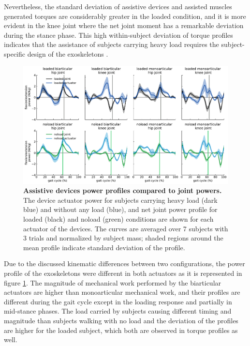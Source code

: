 \documentclass[10pt,letterpaper]{article}
\begin{document}
Nevertheless, the standard deviation of assistive devices and assisted muscles generated torques are considerably greater in the loaded condition, and it is more evident in the knee joint where the net joint moment has a remarkable deviation during the stance phase. This high within-subject deviation of torque profiles indicates that the assistance of subjects carrying heavy load requires the subject-specific design of the exoskeletons \cite{2}.\\
\begin{figure}[ht]   
	\centering
	\includegraphics[width=\linewidth]{Ideal_Exo_MonovsBi_Figures/PaperFigure_Exoskeletons_Power.pdf}
	\vspace{1mm}
	\caption{{\small\textbf{Assistive devices power profiles compared to joint powers.} The device actuator power for subjects carrying heavy load (dark blue) and without any load (blue), and net joint power profile for loaded (black) and noload (green) conditions are shown for each actuator of the devices. The curves are averaged over 7 subjects with 3 trials and normalized by subject mass; shaded regions around the mean profile indicate standard deviation of the profile.}}
	\label{Fig_IdealExo_Power}
\end{figure}
Due to the discussed kinematic differences between two configurations, the power profile of the exoskeletons were different in both actuators as it is represented in figure \ref{Fig_IdealExo_Power}. The magnitude of mechanical work performed by the biarticular actuators are higher than monoarticular mechanical work, and their profiles are different during the gait cycle except in the loading response and partially in mid-stance phases. The load carried by subjects causing different timing and magnitude than subjects walking with no load and the deviation of the profiles are higher for the loaded subject, which both are observed in torque profiles as well.\\
\end{document}
